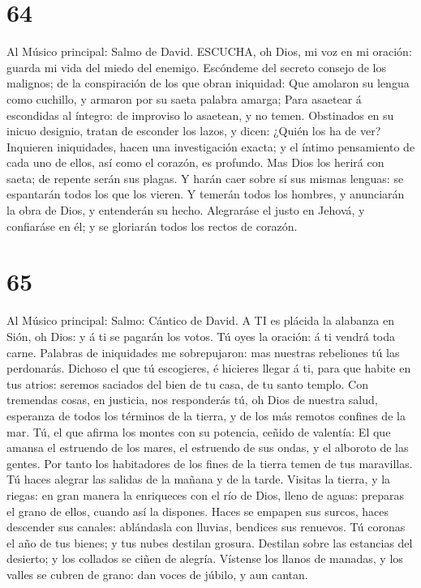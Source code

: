 \hypertarget{section-63}{%
\section{64}\label{section-63}}

 Al Músico principal: Salmo de David. ESCUCHA, oh Dios, mi
voz en mi oración: guarda mi vida del miedo del enemigo. 
Escóndeme del secreto consejo de los malignos; de la conspiración de los
que obran iniquidad:  Que amolaron su lengua como cuchillo,
y armaron por su saeta palabra amarga;  Para asaetear á
escondidas al íntegro: de improviso lo asaetean, y no temen.
 Obstinados en su inicuo designio, tratan de esconder los
lazos, y dicen: ¿Quién los ha de ver?  Inquieren
iniquidades, hacen una investigación exacta; y el íntimo pensamiento de
cada uno de ellos, así como el corazón, es profundo.  Mas
Dios los herirá con saeta; de repente serán sus plagas.  Y
harán caer sobre sí sus mismas lenguas: se espantarán todos los que los
vieren.  Y temerán todos los hombres, y anunciarán la obra
de Dios, y entenderán su hecho.  Alegraráse el justo en
Jehová, y confiaráse en él; y se gloriarán todos los rectos de corazón.

\hypertarget{section-64}{%
\section{65}\label{section-64}}

 Al Músico principal: Salmo: Cántico de David. A TI es
plácida la alabanza en Sión, oh Dios: y á ti se pagarán los votos.
 Tú oyes la oración: á ti vendrá toda carne. 
Palabras de iniquidades me sobrepujaron: mas nuestras rebeliones tú las
perdonarás.  Dichoso el que tú escogieres, é hicieres llegar
á ti, para que habite en tus atrios: seremos saciados del bien de tu
casa, de tu santo templo.  Con tremendas cosas, en justicia,
nos responderás tú, oh Dios de nuestra salud, esperanza de todos los
términos de la tierra, y de los más remotos confines de la mar.
 Tú, el que afirma los montes con su potencia, ceñido de
valentía:  El que amansa el estruendo de los mares, el
estruendo de sus ondas, y el alboroto de las gentes.  Por
tanto los habitadores de los fines de la tierra temen de tus maravillas.
Tú haces alegrar las salidas de la mañana y de la tarde. 
Visitas la tierra, y la riegas: en gran manera la enriqueces con el río
de Dios, lleno de aguas: preparas el grano de ellos, cuando así la
dispones.  Haces se empapen sus surcos, haces descender sus
canales: ablándasla con lluvias, bendices sus renuevos.  Tú
coronas el año de tus bienes; y tus nubes destilan grosura.
 Destilan sobre las estancias del desierto; y los collados
se ciñen de alegría.  Vístense los llanos de manadas, y los
valles se cubren de grano: dan voces de júbilo, y aun cantan.

